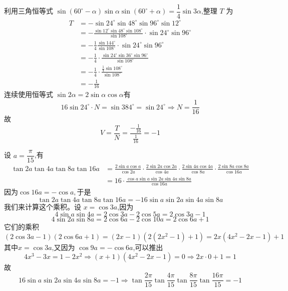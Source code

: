 \begin{questions}
\begin{solution}
        利用三角恒等式 \(\sin(60^\circ - \alpha)\sin \alpha \sin(60^\circ + \alpha) = \dfrac{1}{4}\sin 3\alpha\),整理 \(T\) 为
        \begin{align*}
        T &= -\sin 24^\circ \sin 48^\circ \sin 96^\circ \sin 12^\circ\\
        &= -\frac{\sin 12^{\circ}\sin 48^{\circ}\sin 108^{\circ}}{\sin 108^{\circ}} \cdot \sin 24^{\circ}\sin 96^{\circ}\\
        &=-\frac{1}{4}\frac{\sin 144^{\circ}}{\sin 108^{\circ}} \cdot \sin 24^{\circ}\sin 96^{\circ} \\
        &=-\frac{1}{4} \cdot \frac{\sin 24^\circ \sin 36^\circ \sin 96^\circ}{\sin 108^\circ} \\
        &= -\frac{1}{4} \cdot \frac{\frac{1}{4} \sin 108^\circ}{\sin 108^\circ} \\
        &= -\frac{1}{16}
        \end{align*}
        连续使用恒等式 $\sin2\alpha=2\sin \alpha\cos \alpha$有
        \[
        16\sin 24^\circ \cdot N = \sin 384^\circ = \sin 24^\circ \Rightarrow N = \frac{1}{16}
        \]
        故
        \[
        V = \frac{T}{N} = \frac{-\frac{1}{16}}{\frac{1}{16}} = \boxed{-1}
        \]
    \end{solution}
    \begin{solution}
        设 \(a = \dfrac{\pi}{15}\),有
        \begin{align*}
        \tan 2a \tan 4a \tan 8a \tan 16a &= \frac{2\sin a \cos a}{\cos 2a} \cdot \frac{2\sin 2a \cos 2a}{\cos 4a} \cdot \frac{2\sin 4a \cos 4a}{\cos 8a} \cdot \frac{2\sin 8a \cos 8a}{\cos 16a} \\&=
        16 \cdot \frac{\cos a \sin a \sin 2a \sin 4a \sin 8a}{\cos 16a}
        \end{align*}
        因为$\cos 16a=-\cos a,$于是
        \[
        \tan 2a \tan 4a \tan 8a \tan 16a = -16 \sin a \sin 2a \sin 4a \sin 8a
        \]
        我们来计算这个乘积。设 \(x = \cos 3a\),因为
        \[
        4\sin a \sin 4a = 2\cos3a - 2\cos5a=2\cos 3a-1
        \]
        \[
        4\sin 2a \sin 8a = 2\cos6a - 2\cos10a=2\cos 6a+1
        \]
        它们的乘积
        \[
        (2\cos 3a-1)(2\cos 6a+1)=(2x-1)(2(2x^2-1)+1)=2x(4x^2-2x-1)+1
        \]
        其中$x = \cos 3a$,又因为 \(\cos 9a = -\cos 6a\),可以推出
        \[
        4x^3-3x=1-2x^2 \Rightarrow (x + 1)(4x^2 - 2x - 1) = 0 \Rightarrow 2x\cdot 0+1=1
        \]
        故
        \[
        16 \sin a \sin 2a \sin 4a \sin 8a = -1
        \Rightarrow \tan \dfrac{2\pi}{15} \tan \dfrac{4\pi}{15} \tan \dfrac{8\pi}{15} \tan \dfrac{16\pi}{15} = -1
        \]
    \end{solution}


\end{questions}
